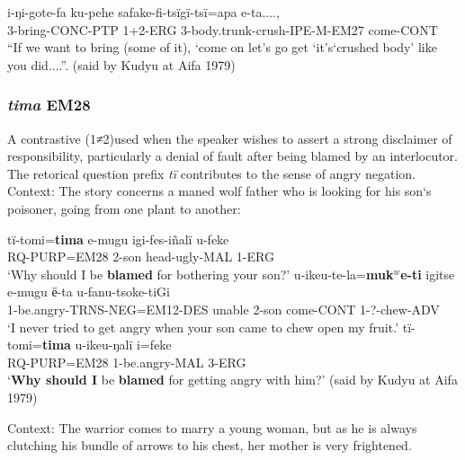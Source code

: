 \documentclass[output=paper]{langsci/langscibook}
\begin{document}
\begin{exe}
	\ex \label{ex:eb69}
	\gll i-ŋi-gote-fa ku-pehe safake-fi-tsïgï-tsï=apa e-ta....,\\
	3-bring-CONC-PTP 1+2-ERG 3-body.trunk-crush-IPE-M-EM27 come-CONT\\
	\trans “If we want to bring (some of it), ‘come on let’s go get ‘it’s‘crushed body’ like you did....”. (said by Kudyu at Aifa 1979)	
\end{exe}

\subsubsection{\textit{tima} EM28}  
A contrastive (1≠2)used when the speaker wishes to assert a strong disclaimer of responsibility, particularly a denial of fault after being blamed by an interlocutor. The retorical question prefix \textit{tï} contributes to the sense of angry negation. Context: The story concerns a  maned wolf father who is looking for his son‘s poisoner,  going from one plant to another: 

\begin{exe}
\ex \label{ex:eb70}
	\begin{xlist}
	\ex \label{ex:eb70a}
	\gll tï-tomi=\textbf{tima} e-mugu igi-fes-iñalï u-feke\\
	RQ-PURP=EM28 2-son head-ugly-MAL 1-ERG\\
	\trans ‘Why should I be \textbf{blamed} for bothering your son?’
	\ex \label{ex:eb70b}
	\gll u-ikeu-te-la=\textbf{muk$^w$e-ti} igitse e-mugu ё-ta u-fanu-tsoke-tiGi\\
	1-be.angry-TRNS-NEG=EM12-DES unable 2-son come-CONT 1-?-chew-ADV\\
	\trans ‘I never tried to get angry when your son came to chew open my fruit.’
	\ex \label{ex:eb70c}
	\gll tï-tomi=\textbf{tima} u-ikeu-ŋalï i=feke\\
	RQ-PURP=EM28 1-be.angry-MAL 3-ERG\\
	\trans ‘\textbf{Why should I} be \textbf{blamed} for getting angry with him?’ (said by Kudyu at Aifa 1979)
\end{xlist}
\end{exe}

Context: The warrior comes to marry a young woman, but as he is always clutching his bundle of arrows to his chest, her mother is very frightened.  
\end{document}
